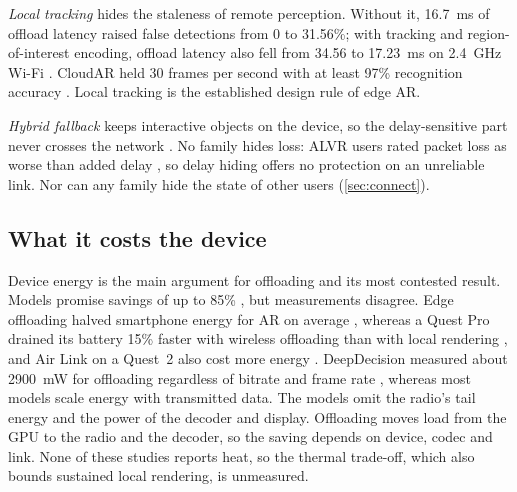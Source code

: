 \emph{Local tracking} hides the staleness of remote perception. Without it, 16.7~ms of offload latency
raised false detections from 0 to 31.56\%; with tracking and region-of-interest encoding, offload latency
also fell from 34.56 to 17.23~ms on 2.4~GHz Wi-Fi \cite{W2965289829}. CloudAR held 30 frames per second
with at least 97\% recognition accuracy \cite{W2765872303}. Local tracking is the established design rule of edge AR.

\emph{Hybrid fallback} keeps interactive objects on the device, so the delay-sensitive part never crosses
the network \cite{W4389296467}. No family hides loss: ALVR users rated packet loss as worse than added
delay \cite{W3095344018}, so delay hiding offers no protection on an unreliable link. Nor can any family hide
the state of other users (\cref{sec:connect}).

\subsection{What it costs the device}

Device energy is the main argument for offloading and its most contested result. Models promise savings
of up to 85\% \cite{W4388068949}, but measurements disagree. Edge offloading halved smartphone energy for
AR on average \cite{W2983318720}, whereas a Quest Pro drained its battery 15\% faster with wireless
offloading than with local rendering \cite{W4362489903}, and Air Link on a Quest~2 also cost more energy
\cite{W4387913063}. DeepDecision measured about 2900~mW for offloading regardless of bitrate and frame
rate \cite{W2792220137}, whereas most models scale energy with transmitted data. The models omit the radio's
tail energy and the power of the decoder and display. Offloading moves load from the GPU to the radio and
the decoder, so the saving depends on device, codec and link. None of these studies reports heat, so the
thermal trade-off, which also bounds sustained local rendering, is unmeasured.

